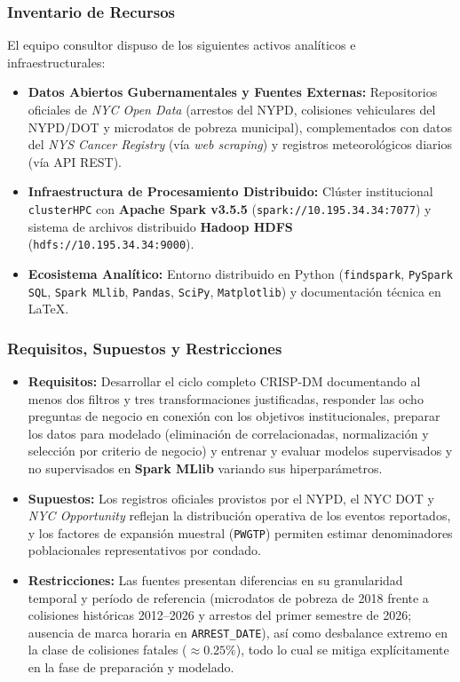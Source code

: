 \subsubsection{Inventario de Recursos}
El equipo consultor dispuso de los siguientes activos analíticos e infraestructurales:
\begin{itemize}
    \item \textbf{Datos Abiertos Gubernamentales y Fuentes Externas:} Repositorios oficiales de \textit{NYC Open Data} (arrestos del NYPD, colisiones vehiculares del NYPD/DOT y microdatos de pobreza municipal), complementados con datos del \textit{NYS Cancer Registry} (vía \textit{web scraping}) y registros meteorológicos diarios (vía API REST).
    \item \textbf{Infraestructura de Procesamiento Distribuido:} Clúster institucional \texttt{clusterHPC} con \textbf{Apache Spark v3.5.5} (\texttt{spark://10.195.34.34:7077}) y sistema de archivos distribuido \textbf{Hadoop HDFS} (\texttt{hdfs://10.195.34.34:9000}).
    \item \textbf{Ecosistema Analítico:} Entorno distribuido en Python (\texttt{findspark}, \texttt{PySpark SQL}, \texttt{Spark MLlib}, \texttt{Pandas}, \texttt{SciPy}, \texttt{Matplotlib}) y documentación técnica en \LaTeX{}.
\end{itemize}

\subsubsection{Requisitos, Supuestos y Restricciones}
\begin{itemize}
    \item \textbf{Requisitos:} Desarrollar el ciclo completo CRISP-DM documentando al menos dos filtros y tres transformaciones justificadas, responder las ocho preguntas de negocio en conexión con los objetivos institucionales, preparar los datos para modelado (eliminación de correlacionadas, normalización y selección por criterio de negocio) y entrenar y evaluar modelos supervisados y no supervisados en \textbf{Spark MLlib} variando sus hiperparámetros.
    \item \textbf{Supuestos:} Los registros oficiales provistos por el NYPD, el NYC DOT y \textit{NYC Opportunity} reflejan la distribución operativa de los eventos reportados, y los factores de expansión muestral (\texttt{PWGTP}) permiten estimar denominadores poblacionales representativos por condado.
    \item \textbf{Restricciones:} Las fuentes presentan diferencias en su granularidad temporal y período de referencia (microdatos de pobreza de 2018 frente a colisiones históricas 2012--2026 y arrestos del primer semestre de 2026; ausencia de marca horaria en \texttt{ARREST\_DATE}), así como desbalance extremo en la clase de colisiones fatales ($\approx 0.25\%$), todo lo cual se mitiga explícitamente en la fase de preparación y modelado.
\end{itemize}

